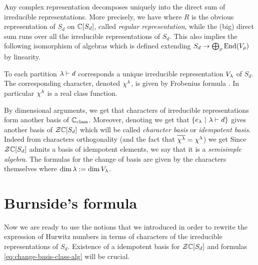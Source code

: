 \documentclass[../main/main.tex]{subfiles}
\begin{document}
Any complex representation decomposes uniquely into the direct sum of irreducible representations. More precisely, we have
where $R$ is the obvious representation of $S_d$ on $\mathbb C[S_d]$, called \emph{regular representation}, while the (big) direct sum runs over all the irreducible representations of $S_d$. This also implies the following isomorphism of algebras
which is defined extending $S_d\to\bigoplus_\rho\operatorname{End}(V_\rho)$ by linearity.

\begin{theorem}[{\cite[Thm. 4.3]{FH}}]
	To each partition $\lambda\vdash d$ corresponds a unique irreducible representation $V_\lambda$ of $S_d$. The corresponding character, denoted $\chi^\lambda$, is given by Frobenius formula \cite[Eq. 4.10]{FH}. In particular $\chi^\lambda$ is a real class function.
\end{theorem}

By dimensional arguments, we get that characters of irreducible representations form another basis of $\mathbb C_{\text{class}}$. Moreover, denoting
we get that $\{e_\lambda\ |\ \lambda\vdash d\}$ gives another basis of $\mathcal Z\mathbb C[S_d]$
which will be called \emph{character basis} or \emph{idempotent basis}. Indeed from characters orthogonality (and the fact that $\overline{\chi^\lambda}=\chi^\lambda$) we get
Since $\mathcal Z\mathbb C[S_d]$ admits a basis of idempotent elements, we say that it is a \emph{semisimple algebra}. The formulas for the change of basis are given by the characters themselves
where $\dim \lambda:=\dim V_\lambda$. 

\section{Burnside's formula}

Now we are ready to use the notions that we introduced in order to rewrite the expression of Hurwitz numbers in terms of characters of the irreducible representations of $S_d$. Existence of a idempotent basis for $\mathcal Z\mathbb C[S_d]$ and formulas \eqref{eq:change-basis-class-alg} will be crucial. 
\end{document}
